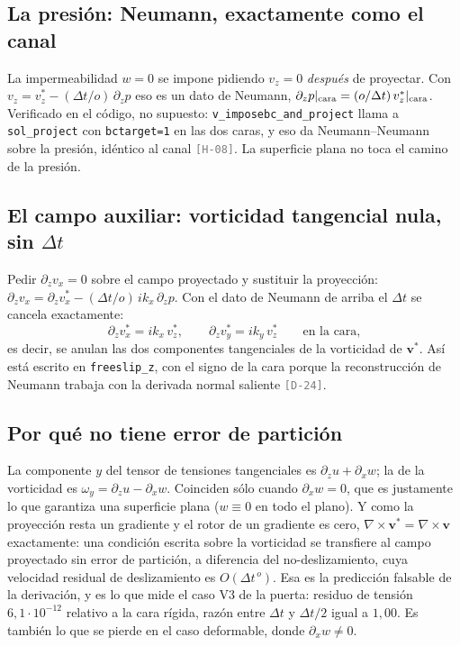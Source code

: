 \documentclass[11pt,a4paper]{article}
\newcommand{\etq}[1]{\textcolor{gray}{\texttt{[#1]}}}
\begin{document}
\subsection{La presión: Neumann, exactamente como el canal}

La impermeabilidad $w=0$ se impone pidiendo $v_z=0$ \emph{después} de proyectar. Con
$v_z=v_z^*-(\Delta t/o)\,\partial_z p$ eso es un dato de Neumann,
$\partial_z p|_{\rm cara}=(o/\Delta t)\,v_z^*|_{\rm cara}$. Verificado en el código, no
supuesto: \texttt{v\_imposebc\_and\_project} llama a \texttt{sol\_project} con
\texttt{bctarget=1} en las dos caras, y eso da Neumann--Neumann sobre la presión, idéntico
al canal \etq{H-08}. La superficie plana no toca el camino de la presión.

\subsection{El campo auxiliar: vorticidad tangencial nula, sin $\Delta t$}

Pedir $\partial_z v_x=0$ sobre el campo proyectado y sustituir la proyección:
$\partial_z v_x=\partial_z v_x^*-(\Delta t/o)\,ik_x\,\partial_z p$. Con el dato de Neumann
de arriba el $\Delta t$ se cancela exactamente:
\begin{equation}
  \partial_z v_x^*=ik_x\,v_z^*,\qquad \partial_z v_y^*=ik_y\,v_z^*\qquad\text{en la cara,}
  \label{eq:vstar}
\end{equation}
es decir, se anulan las dos componentes tangenciales de la vorticidad de
$\boldsymbol v^*$. Así está escrito en \texttt{freeslip\_z}, con el signo de la cara
porque la reconstrucción de Neumann trabaja con la derivada normal saliente \etq{D-24}.

\subsection{Por qué no tiene error de partición}
\label{sec:exacta}

La componente $y$ del tensor de tensiones tangenciales es $\partial_z u+\partial_x w$; la
de la vorticidad es $\omega_y=\partial_z u-\partial_x w$. Coinciden sólo cuando
$\partial_x w=0$, que es justamente lo que garantiza una superficie plana ($w\equiv0$ en
todo el plano). Y como la proyección resta un gradiente y el rotor de un gradiente es
cero, $\nabla\times\boldsymbol v^*=\nabla\times\boldsymbol v$ exactamente: una condición
escrita sobre la vorticidad se transfiere al campo proyectado sin error de partición, a
diferencia del no-deslizamiento, cuya velocidad residual de deslizamiento es
$O(\Delta t^{\,o})$. Esa es la predicción falsable de la derivación, y es lo que mide el
caso V3 de la puerta: residuo de tensión $6{,}1\cdot10^{-12}$ relativo a la cara rígida,
razón entre $\Delta t$ y $\Delta t/2$ igual a $1{,}00$. Es también lo que se pierde en el
caso deformable, donde $\partial_x w\neq0$.
\end{document}
